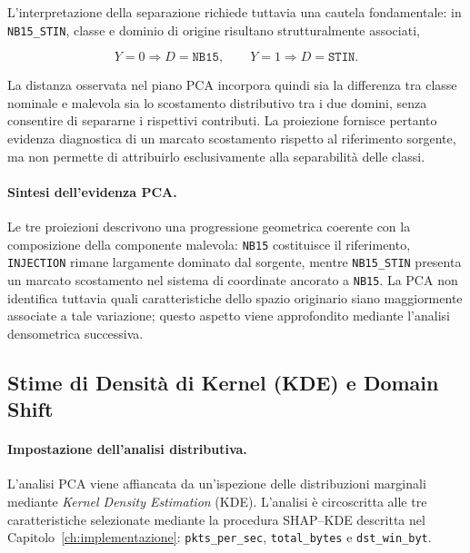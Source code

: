 L'interpretazione della separazione richiede tuttavia una cautela fondamentale: in \texttt{NB15\_STIN}, classe e dominio di origine risultano strutturalmente associati,

\[
    Y=0 \Rightarrow D=\texttt{NB15},
    \qquad
    Y=1 \Rightarrow D=\texttt{STIN}.
\]

La distanza osservata nel piano PCA incorpora quindi sia la differenza tra classe nominale e malevola sia lo scostamento distributivo tra i due domini, senza consentire di separarne i rispettivi contributi. 
La proiezione fornisce pertanto evidenza diagnostica di un marcato scostamento rispetto al riferimento sorgente, ma non permette di attribuirlo esclusivamente alla separabilità delle classi.

\paragraph{Sintesi dell'evidenza PCA.}
Le tre proiezioni descrivono una progressione geometrica coerente con la composizione della componente malevola: \texttt{NB15} costituisce il riferimento, \texttt{INJECTION} rimane largamente dominato dal sorgente, mentre \texttt{NB15\_STIN} presenta un marcato scostamento nel sistema di coordinate ancorato a \texttt{NB15}. 
La PCA non identifica tuttavia quali caratteristiche dello spazio originario siano maggiormente associate a tale variazione; questo aspetto viene approfondito mediante l'analisi densometrica successiva.



\subsection{Stime di Densità di Kernel (KDE) e Domain Shift}
\label{subsec:stime_kde}

\paragraph{Impostazione dell'analisi distributiva.}
L'analisi PCA viene affiancata da un'ispezione delle distribuzioni marginali mediante \textit{Kernel Density Estimation} (KDE). 
L'analisi è circoscritta alle tre caratteristiche selezionate mediante la procedura SHAP--KDE descritta nel Capitolo~\ref{ch:implementazione}: \texttt{pkts\_per\_sec}, \texttt{total\_bytes} e \texttt{dst\_win\_byt}.

